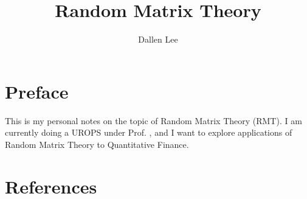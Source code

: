 \documentclass[12pt, a4paper]{article}
\title{\textbf{Random Matrix Theory}} %
\author{Dallen Lee}
\theoremstyle{plain}
\theoremstyle{definition}
\theoremstyle{remark}
\begin{document}

\maketitle
\thispagestyle{empty}
\tableofcontents


\section*{Preface}
This is my personal notes on the topic of Random Matrix Theory (RMT). I am currently doing a UROPS under Prof. , and I want to explore applications of Random Matrix Theory to Quantitative Finance.
\newpage


\section{}




\pagebreak
\section{References}
\end{document}
